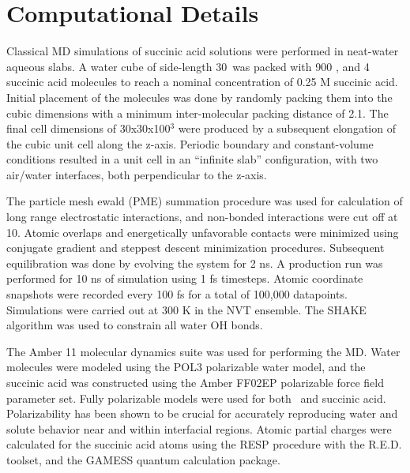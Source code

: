 \section {Computational Details}

Classical MD simulations of succinic acid solutions were performed in neat-water aqueous slabs. A water cube of side-length 30\angs~was packed with 900 \wat, and 4 succinic acid molecules to reach a nominal concentration of 0.25 M succinic acid. Initial placement of the molecules was done by randomly packing them into the cubic dimensions with a minimum inter-molecular packing distance of 2.1\angs.\cite{Martinez2009, Martinez2003} The final cell dimensions of 30x30x100\angs$^3$ were produced by a subsequent elongation of the cubic unit cell along the z-axis. Periodic boundary and constant-volume conditions resulted in a unit cell in an ``infinite slab'' configuration, with two air/water interfaces, both perpendicular to the z-axis.\cite{Wilson1991}

The particle mesh ewald (PME) summation procedure was used for calculation of long range electrostatic interactions, and non-bonded interactions were cut off at 10\angs.\cite{Essmann1995} Atomic overlaps and energetically unfavorable contacts were minimized using conjugate gradient and steppest descent minimization procedures. Subsequent equilibration was done by evolving the system for 2 ns. A production run was performed for 10 ns of simulation using 1 fs timesteps. Atomic coordinate snapshots were recorded every 100 fs for a total of 100,000 datapoints. Simulations were carried out at 300 K in the NVT ensemble. The SHAKE algorithm was used to constrain all water OH bonds.\cite{Ryckaert1977}

The Amber 11 molecular dynamics suite was used for performing the MD.\cite{Case2010} Water molecules were modeled using the POL3 polarizable water model,\cite{Dang1992, Caldwell1995} and the succinic acid was constructed using the Amber FF02EP polarizable force field parameter set. Fully polarizable models were used for both \wat~and succinic acid. Polarizability has been shown to be crucial for accurately reproducing water and solute behavior near and within interfacial regions.\cite{Dang1998} Atomic partial charges were calculated for the succinic acid atoms using the RESP procedure with the R.E.D. toolset, and the GAMESS quantum calculation package.\cite{Pigache2004, Dupradeau2010, Schmidt1993}
